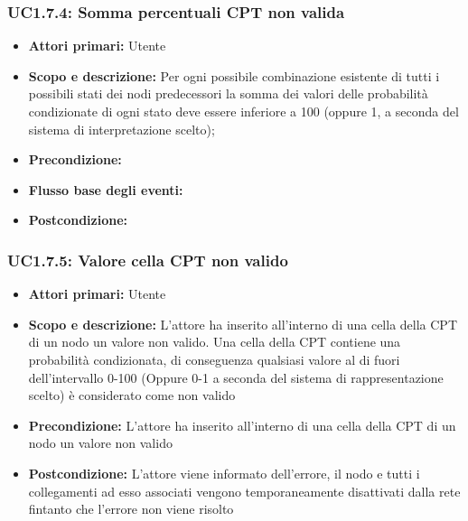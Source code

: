 \subsubsection{UC1.7.4: Somma percentuali CPT non valida} 
\begin{itemize} 
	\item{\textbf{Attori primari:} Utente} 
	\item{\textbf{Scopo e descrizione:} Per ogni possibile combinazione esistente di tutti i possibili stati dei nodi predecessori la somma dei valori delle probabilità condizionate di ogni stato deve essere inferiore a 100 (oppure 1, a seconda del sistema di interpretazione scelto);} 
	\item{\textbf{Precondizione:} } 
	\item{\textbf{Flusso base degli eventi:} } 
	\item{\textbf{Postcondizione:} } 
\end{itemize} 
\subsubsection{UC1.7.5: Valore cella CPT non valido} 
\begin{itemize} 
	\item{\textbf{Attori primari:} Utente} 
	\item{\textbf{Scopo e descrizione:} L'attore ha inserito all'interno di una cella della CPT di un nodo un valore non valido. Una cella della CPT contiene una probabilità condizionata, di conseguenza qualsiasi valore al di fuori dell'intervallo 0-100 (Oppure 0-1 a seconda del sistema di rappresentazione scelto) è considerato come non valido} 
	\item{\textbf{Precondizione:} L'attore ha inserito all'interno di una cella della CPT di un nodo un valore non valido} 
	\item{\textbf{Postcondizione:} L'attore viene informato dell'errore, il nodo e tutti i collegamenti ad esso associati vengono temporaneamente disattivati dalla rete fintanto che l'errore non viene risolto} 
\end{itemize} 
